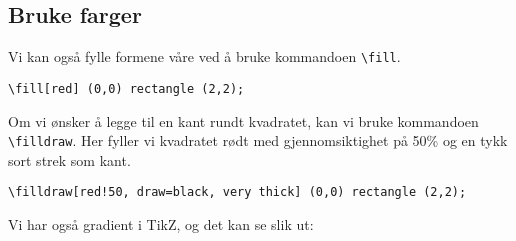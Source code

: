 \documentclass[12pt, a4paper]{article}
\begin{document}
\subsection{Bruke farger}
Vi kan også fylle formene våre ved å bruke kommandoen \texttt{\textbackslash fill}.

\begin{center}
\end{center}

\begin{Verbatim}[fontsize=\small]
\fill[red] (0,0) rectangle (2,2);
\end{Verbatim}

\noindent Om vi ønsker å legge til en kant rundt kvadratet, kan vi bruke kommandoen \texttt{\textbackslash filldraw}. Her fyller vi kvadratet rødt med gjennomsiktighet på 50\% og en tykk sort strek som kant.

\begin{center}
\end{center}

\begin{Verbatim}[fontsize=\small]
\filldraw[red!50, draw=black, very thick] (0,0) rectangle (2,2);
\end{Verbatim}

\newpage

\noindent Vi har også gradient i TikZ, og det kan se slik ut:

\vspace{15pt}

\begin{center}
\begin{minipage}{0.3\textwidth}
\end{minipage}
\begin{minipage}{0.3\textwidth}
\end{minipage}
\begin{minipage}{0.3\textwidth}
\end{minipage}
\end{center}
\vspace{10pt}
\end{document}
